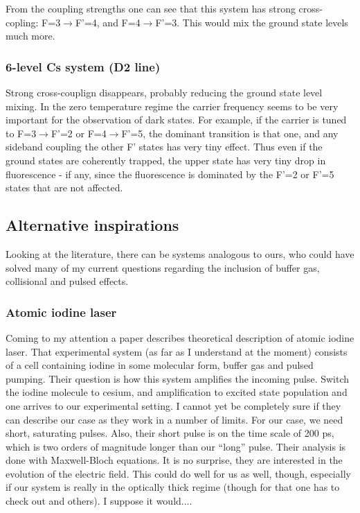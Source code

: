 \documentclass{article}
\begin{document}
\begin{spacing}{1.1}
From the coupling strengths one can see that this system has strong cross-copling: F=3$\rightarrow$F'=4, and F=4$\rightarrow$F'=3. This would mix the ground state levels much more.


\subsubsection{6-level Cs system (D2 line)}

Strong cross-couplign disappears, probably reducing the ground state level mixing. In the zero temperature regime the carrier frequency seems to be  very important for the observation of dark states. For example, if the carrier is tuned to F=3$\rightarrow$F'=2 or F=4$\rightarrow$F'=5, the dominant transition is that one, and any sideband coupling the other F' states has very tiny effect. Thus even if the ground states are coherently trapped, the upper state has very tiny drop in fluorescence - if any, since the fluorescence is dominated by the F'=2 or F'=5 states that are not affected.



\subsection{Alternative inspirations}

Looking at the literature, there can be systems analogous to ours, who could have solved many of my current questions regarding the inclusion of buffer gas, collisional and pulsed effects.

\subsubsection{Atomic iodine laser}

Coming to my attention a paper \cite{Riley1979} describes theoretical description of atomic iodine laser. That experimental system (as far as I understand at the moment) consists of a cell containing iodine in some molecular form, buffer gas and pulsed pumping. Their question is how this system amplifies the incoming pulse. Switch the iodine molecule to cesium, and amplification to excited state population and one arrives to our experimental setting. I cannot yet be completely sure if they can describe our case as they work in a number of limits. For our case, we need short, saturating pulses. Also, their short pulse is on the time scale of 200 ps, which is two orders of magnitude longer than our ``long'' pulse. Their analysis is done with Maxwell-Bloch equations. It is no surprise, they are interested in the evolution of the electric field. This could do well for us as well, though, especially if our system is really in the optically thick regime (though for that one has to check out \cite{Godone2002} and others). I suppose it would....


\end{spacing}
\end{document}
